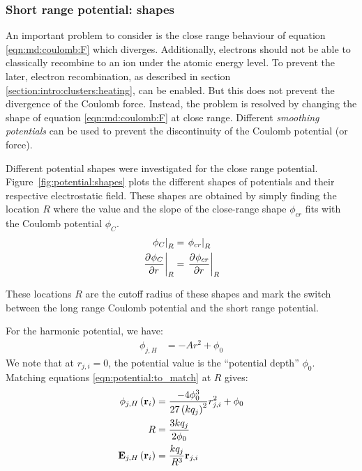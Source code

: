 



\subsubsection{Short range potential: shapes}

An important problem to consider is the close range behaviour of equation
\eqref{eqn:md:coulomb:F} which diverges. Additionally, electrons should not be
able to classically recombine to an ion under the atomic energy level. To
prevent the later, electron recombination, as described in section
\ref{section:intro:clusters:heating}, can be enabled. But this does not prevent
the divergence of the Coulomb force. Instead, the problem is resolved by
changing the shape of equation \eqref{eqn:md:coulomb:F} at close range.
Different \textit{smoothing potentials} can be used to prevent the
discontinuity of the Coulomb potential (or force).


Different potential shapes were investigated for the close range potential.
Figure~\ref{fig:potential:shapes} plots the different shapes of potentials and
their respective electrostatic field. These shapes are obtained by simply
finding the location $R$ where the value and the slope of the close-range shape
$\phi_{cr}$ fits with the Coulomb potential $\phi_C$.
\begin{subequations}
\begin{align}
\left. \phi_C        \right|_{R} & = \left. \phi_{cr} \right|_{R} \\
\left. \frac{\partial^{{}} \phi_C}{\partial r^{{}}} \right|_{R} & = \left. \frac{\partial^{{}} \phi_{cr}}{\partial r^{{}}} \right|_{R}
\end{align}
\label{eqn:potential:to_match}
\end{subequations}

These locations $R$ are the cutoff radius of these shapes and mark the switch
between the long range Coulomb potential and the short range potential.

For the harmonic potential, we have:
\begin{align}
\phi_{j,H} & = -A r^2 + \phi_0
\end{align}
We note that at $r_{j,i} = 0$, the potential value is the ``potential depth''
$\phi_0$.
Matching equations \eqref{eqn:potential:to_match} at $R$ gives:
\begin{subequations}
\begin{align}
\phi_{j,H}\left( \textbf{r}_i \right) & = \frac{-4 \phi_0^3}{27 \left( k q_j \right)^2} r_{j,i}^2 + \phi_0
\\
R & = \frac{3 k q_j}{2 \phi_0} \\
\textbf{E}_{j,H}\left( \textbf{r}_i \right) & = \frac{k q_j}{R^3} \textbf{r}_{j,i}
\end{align}
\end{subequations}


